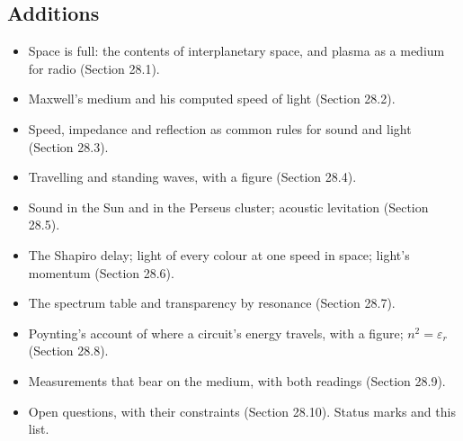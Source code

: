 \subsection*{Additions}
\begin{itemize}
\item Space is full: the contents of interplanetary space, and plasma as a medium for radio (Section 28.1).
\item Maxwell's medium and his computed speed of light (Section 28.2).
\item Speed, impedance and reflection as common rules for sound and light (Section 28.3).
\item Travelling and standing waves, with a figure (Section 28.4).
\item Sound in the Sun and in the Perseus cluster; acoustic levitation (Section 28.5).
\item The Shapiro delay; light of every colour at one speed in space; light's momentum (Section 28.6).
\item The spectrum table and transparency by resonance (Section 28.7).
\item Poynting's account of where a circuit's energy travels, with a figure; $n^2 = \varepsilon_r$ (Section 28.8).
\item Measurements that bear on the medium, with both readings (Section 28.9).
\item Open questions, with their constraints (Section 28.10). Status marks and this list.
\end{itemize}

\normalsize
\nocite{rashadaPart15}


